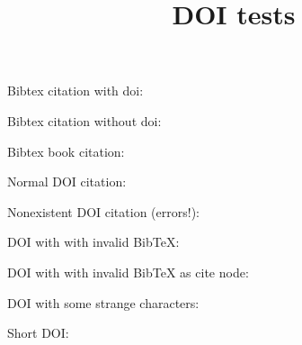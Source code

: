 \documentclass[a4paper,11pt,oneside]{book}
\title{\Huge \textbf{DOI tests}}
\author{\textsc{}}
\begin{document}
\sloppy

\frontmatter
\maketitle

\tableofcontents

\mainmatter

% 
% 

Bibtex citation with doi: \cite{Vogel2018systemic}

Bibtex citation without doi: \cite{Meurer2020framework}

Bibtex book citation: \cite{RN1}

Normal DOI citation: \cite{Koch_2012}

Nonexistent DOI citation (errors!): \href{https://doi.org/10.1111/j.1365-246X.2012.99999.x}{}

DOI with with invalid BibTeX: \cite{EFSA2019Dietary}

DOI with with invalid BibTeX as cite node: \cite{EFSA2019Dietary}

DOI with some strange characters: \cite{Bartels_1997}

Short DOI: \cite{PRIESTLEY_1972}



\end{document}
